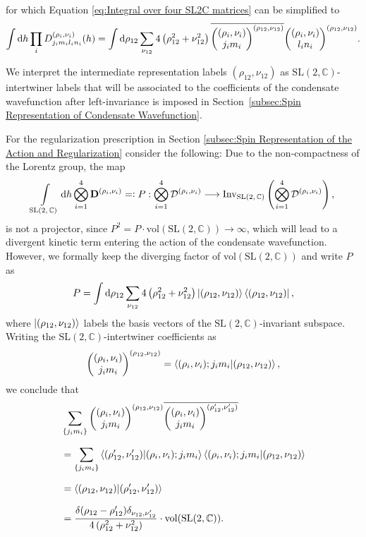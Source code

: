\documentclass[11pt,a4paper]{article}
\newcommand{\C}{\mathbb C}
\newcommand{\SL}{\text{SL$(2,\C)$}}
\newcommand{\eqdef}{=\vcentcolon}
\begin{document}
%
for which Equation \eqref{eq:Integral over four SL2C matrices} can be simplified to
%
\begin{equation}\label{eq:simplified integral over four SL2C matrices}
\int\dd{h}\prod_i D^{(\rho_i,\nu_i)}_{j_i m_i l_i n_i}(h)
=
\int\dd{\rho_{12}}\sum_{\nu_{12}}4\left(\rho_{12}^2+\nu_{12}^2\right)\overline{\mqty((\rho_i,\nu_i) \\ j_i m_i)^{(\rho_{12},\nu_{12})}}\mqty((\rho_i,\nu_i) \\ l_i n_i)^{(\rho_{12},\nu_{12})}.
\end{equation}

We interpret the intermediate representation labels $(\rho_{12},\nu_{12})$ as $\SL$-intertwiner labels that will be associated to the coefficients of the condensate wavefunction after left-invariance is imposed in Section~\ref{subsec:Spin Representation of Condensate Wavefunction}.

For the regularization prescription in Section \ref{subsec:Spin Representation of the Action and Regularization} consider the following: Due to the non-compactness of the Lorentz group, the map
%
\begin{equation}
\int\limits_{\SL}\dd{h}\bigotimes_{i=1}^4\mathbf{D}^{(\rho_i,\nu_i)} \eqdef P : \bigotimes_{i=1}^4 \mathcal{D}^{(\rho_i,\nu_i)} \longrightarrow \text{Inv}_{\SL}\left(\bigotimes_{i=1}^4 \mathcal{D}^{(\rho_i,\nu_i)}\right),
\end{equation}
%
is not a projector, since $P^2 = P\cdot \text{vol}(\SL) \rightarrow\infty$, which will lead to a divergent kinetic term entering the action of the condensate wavefunction. However, we formally keep the diverging factor of vol$(\SL)$ and write $P$ as
%
\begin{equation}
P = \int\dd{\rho_{12}}\sum_{\nu_{12}}4\left(\rho_{12}^2+\nu_{12}^2\right)\ket{(\rho_{12},\nu_{12})}\bra{(\rho_{12},\nu_{12})},
\end{equation}
%
where $\ket{(\rho_{12},\nu_{12})}$ labels the basis vectors of the $\SL$-invariant subspace. Writing the $\SL$-intertwiner coefficients as
%
\begin{equation}
\mqty((\rho_i,\nu_i) \\ j_i m_i)^{(\rho_{12},\nu_{12})} = \braket{(\rho_i,\nu_i);j_i m_i}{(\rho_{12},\nu_{12})},
\end{equation}
%
we conclude that
%
\begin{equation}\label{eq:divergence of SL2C intertwiners}
\begin{aligned}
& \sum_{\{j_i m_i\}}\mqty((\rho_i,\nu_i) \\ j_i m_i)^{(\rho_{12},\nu_{12})}\overline{\mqty((\rho_i,\nu_i) \\ j_i m_i)^{(\rho_{12}',\nu_{12}')}}\\[7pt]
& =
\sum_{\{j_i m_i\}}\braket{(\rho_{12}',\nu_{12}')}{(\rho_i,\nu_i);j_i m_i}\braket{(\rho_i,\nu_i);j_i m_i}{(\rho_{12},\nu_{12})}\\[7pt]
& =
\braket{(\rho_{12},\nu_{12})}{(\rho_{12}',\nu_{12}')}\\[7pt]
& =
\frac{\delta(\rho_{12}-\rho_{12}')\delta_{\nu_{12},\nu_{12}'}}{4\left(\rho_{12}^2+\nu_{12}^2\right)}\cdot\text{vol}(\SL).
\end{aligned}
\end{equation}
%
\end{document}
